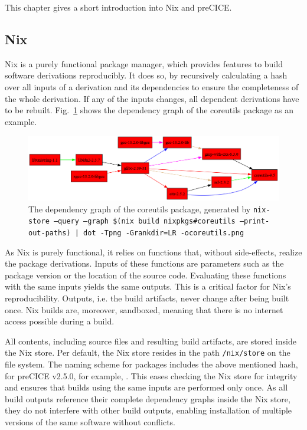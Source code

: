 \documentclass{eceasst}
\begin{document}
This chapter gives a short introduction into Nix and preCICE.

\subsection{Nix}\label{sec:nix}

Nix is a purely functional package manager, which provides features to build software derivations reproducibly.
It does so, by recursively calculating a hash over all inputs of a derivation and its dependencies to ensure the completeness of the whole derivation.
If any of the inputs changes, all dependent derivations have to be rebuilt.
Fig.~\ref{fig:nix-graph} shows the dependency graph of the coreutils package as an example.

\begin{figure}
    \centering
    \includegraphics[width=1\textwidth]{figures/coreutils.png}
    \caption{The dependency graph of the coreutils package, generated by \texttt{nix-store --query --graph \$(nix build nixpkgs\#coreutils --print-out-paths) | dot -Tpng -Grankdir=LR -ocoreutils.png}}
    \label{fig:nix-graph}
\end{figure}

As Nix is purely functional, it relies on functions that, without side-effects, realize the package derivations.
Inputs of these functions are parameters such as the package version or the location of the source code.
Evaluating these functions with the same inputs yields the same outputs.
This is a critical factor for Nix's reproducibility.
Outputs, i.e. the build artifacts, never change after being built once.
Nix builds are, moreover, sandboxed, meaning that there is no internet access possible during a build.

All contents, including source files and resulting build artifacts, are stored inside the Nix store.
Per default, the Nix store resides in the path \texttt{/nix/store} on the file system.
The naming scheme for packages includes the above mentioned hash, for preCICE v2.5.0, for example,
.
This eases checking the Nix store for integrity and ensures that builds using the same inputs are performed only once.
As all build outputs reference their complete dependency graphs inside the Nix store, they do not interfere with other build outputs, enabling installation of multiple versions of the same software without conflicts.
\end{document}
